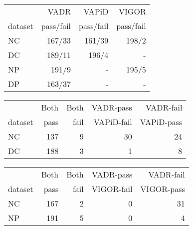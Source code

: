 \documentclass{bmcart}
\begin{document}
\thispagestyle{empty}

\begin{table}[t]
\begin{tabular}{|l|r|r|r|}
\hline
         & VADR       & VAPiD     & VIGOR      \\
 dataset & pass/fail  & pass/fail & pass/fail  \\ \hline
       NC &  167/33 &  161/39 &   198/2 \\ 
       DC &  189/11 &   196/4 &       - \\ 
       NP &   191/9 &       - &   195/5 \\ 
       DP &  163/37 &       - &       - \\ 
\hline 
\end{tabular}
\end{table}
\begin{table}[t]
\begin{tabular}{|l|r|r|r|r|}
\hline
         & Both       & Both       & VADR-pass  & VADR-fail  \\
 dataset & pass       & fail       & VAPiD-fail & VAPiD-pass \\ \hline
       NC &    137 &      9 &     30 &     24 \\ 
       DC &    188 &      3 &      1 &      8 \\ 
\hline 
\end{tabular}
\end{table}
\begin{table}[t]
\begin{tabular}{|l|r|r|r|r|}
\hline
         & Both       & Both       & VADR-pass  & VADR-fail  \\
 dataset & pass       & fail       & VIGOR-fail & VIGOR-pass \\ \hline
       NC &    167 &      2 &      0 &     31 \\ 
       NP &    191 &      5 &      0 &      4 \\ 
\hline 
\end{tabular}
\end{table}

\vfill
\end{document}
